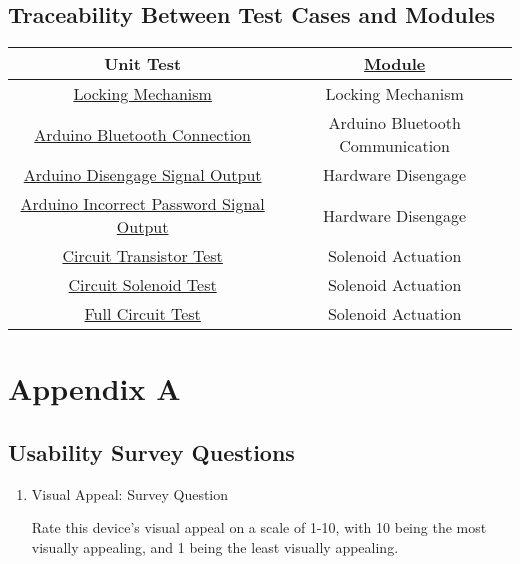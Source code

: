 \documentclass[12pt, titlepage]{article}
\begin{document}
\subsection{Traceability Between Test Cases and Modules}

\begin{center}

\begin{tabular}{|c|c|}
  \hline
  \textbf{Unit Test} & \textbf{\href{https://github.com/NevoAbigail/Capstone/blob/main/docs/Design/SoftArchitecture/MG.pdf}{Module}} \\
  \hline
  \hyperref[lock-mech]{Locking Mechanism} & Locking Mechanism \\
  \hline
  \hyperref[arduinoBluetoothConnection]{Arduino Bluetooth Connection} & Arduino Bluetooth Communication\\
  \hline
  \hyperref[arduinoDisengageSignalOutput]{Arduino Disengage Signal Output} & Hardware Disengage \\
  \hline
  \hyperref[arduinoIncorrect]{Arduino Incorrect Password Signal Output} & Hardware Disengage \\
  \hline
  \hyperref[circuitTransistorTest]{Circuit Transistor Test} & Solenoid Actuation \\
  \hline
  \hyperref[circuitSolenoidTest]{Circuit Solenoid Test} & Solenoid Actuation \\
  \hline
  \hyperref[fullCircuitTest]{Full Circuit Test} & Solenoid Actuation \\
  \hline
  
\end{tabular}
\end{center}
				




\newpage

\section{Appendix A}

\subsection{Usability Survey Questions}

\begin{enumerate}

\item{Visual Appeal: Survey Question}
\label{Survey}

Rate this device's visual appeal on a scale of 1-10, with 10 being the most visually appealing, and 1 being the least visually appealing.
\end{enumerate}
\end{document}
